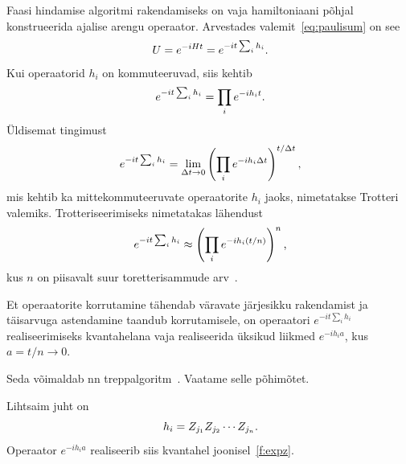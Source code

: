 \documentclass[12pt]{report}
\def\paren#1{\left(#1\right)}
\begin{document}
Faasi hindamise algoritmi rakendamiseks on vaja hamiltoniaani põhjal konstrueerida ajalise arengu operaator.
Arvestades valemit~\eqref{eq:paulisum} on see
\begin{align}
    U = e^{-iHt} = e^{-it\sum_i h_i} \rlap{.}
\end{align}
Kui operaatorid \(h_i\) on kommuteeruvad, siis kehtib
\begin{align}
    e^{-it\sum_i h_i} = \prod_i e^{-i h_i t} \rlap{.}
\end{align}
Üldisemat tingimust
\begin{align}
    e^{-it\sum_i h_i}
    = \lim_{\Delta t \rightarrow 0} \paren{\prod_i e^{-i h_i \Delta t}}^{t / \Delta t} \rlap{,}
\end{align}
mis kehtib ka mittekommuteeruvate operaatorite \(h_i\) jaoks, nimetatakse Trotteri valemiks.
Trotteriseerimiseks nimetatakas lähendust
\begin{align}\label{eq:trot}
    e^{-it\sum_i h_i}
    \approx \paren{\prod_i e^{-i h_i (t / n)}}^n \rlap{,}
\end{align}
kus \(n\) on piisavalt suur toretterisammude arv~\cite{whitfield+etal2011, nielsen+chuang}.

Et operaatorite korrutamine tähendab väravate järjesikku rakendamist ja täisarvuga astendamine taandub korrutamisele, on operaatori \(e^{-i t \sum_i h_i}\) realiseerimiseks kvantahelana vaja realiseerida üksikud liikmed \(e^{-i h_i a}\), kus \(a = t /n \rightarrow 0\).

Seda võimaldab nn treppalgoritm~\cite{nielsen+chuang, mansky+etal}.
Vaatame selle põhimõtet.

Lihtsaim juht on
\begin{equation}\label{eq:onlyz}
  h_i = Z_{j_1}Z_{j_2}\cdots Z_{j_n} \rlap{.}
\end{equation}
Operaator \(e^{-i h_i a}\) realiseerib siis kvantahel joonisel~\ref{f:expz}.
\end{document}
